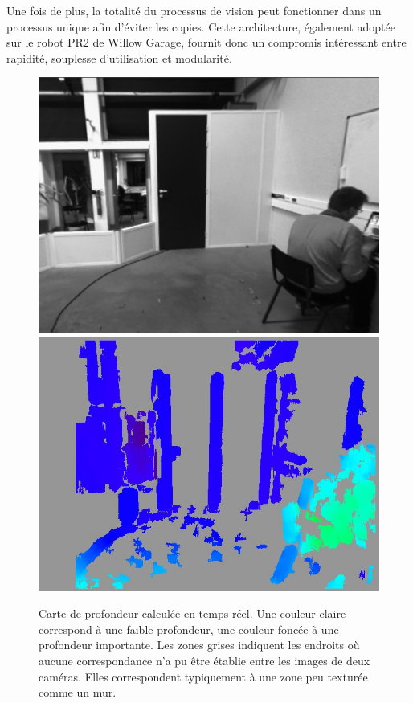 Une fois de plus, la totalité du processus de vision peut fonctionner
dans un processus unique afin d'éviter les copies. Cette architecture,
également adoptée sur le robot PR2 de Willow
Garage, fournit donc un compromis intéressant entre rapidité,
souplesse d'utilisation et modularité.

\begin{figure}
  \begin{center}
    \includegraphics[width=.95\linewidth]{src/chap4-integration/disparity-1.jpg}
    \includegraphics[width=.95\linewidth]{src/chap4-integration/disparity-2.jpg}
  \end{center}
  \caption{Carte de profondeur calculée en temps réel. Une couleur
    claire correspond à une faible profondeur, une couleur foncée à
    une profondeur importante. Les zones grises indiquent les endroits
    où aucune correspondance n'a pu être établie entre les images de
    deux caméras. Elles correspondent typiquement à une zone peu
    texturée comme un mur.}
\end{figure}


